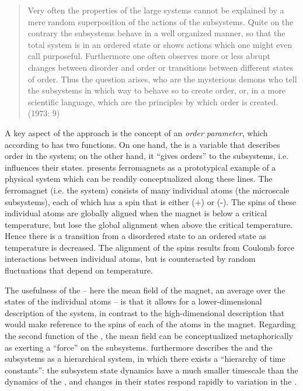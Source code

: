 \begin{quote}
    Very often the properties of the large systems cannot be explained by a mere random superposition of the actions of the subsystems. Quite on the contrary the subsystems behave in a well organized manner, so that the total system is in an ordered state or shows actions which one might even call purposeful. Furthermore one often observes more or less abrupt changes between disorder and order or transitions between different states of order. Thus the question arises, who are the mysterious demons who tell the subsystems in which way to behave so to create order, or, in a more scientific language, which are the principles by which order is created. (1973: 9)
\end{quote}

A key aspect of the  approach is the concept of an \textit{order parameter}, which according to  has two functions. On one hand, the  is a variable that describes order in the system; on the other hand, it “gives orders” \citep[10]{Haken1973} to the subsystems, i.e. influences their states.  presents ferromagnets as a prototypical example of a physical system which can be readily conceptualized along these lines. The ferromagnet (i.e. the  system) consists of many individual atoms (the microscale subsystems), each of which has a spin that is either (+) or (-). The spins of these individual atoms are globally aligned when the magnet is below a critical temperature, but lose the global alignment when above the critical temperature. Hence there is a transition from a disordered state to an ordered state as temperature is decreased. The alignment of the spins results from Coulomb force interactions between individual atoms, but is counteracted by random fluctuations that depend on temperature. 

The usefulness of the  -- here the mean field of the magnet, an average over the states of the individual atoms -- is that it allows for a lower-di\-men\-sional description of the system, in contrast to the high-di\-men\-sional description that would make reference to the spins of each of the atoms in the magnet. Regarding the second function of the , the mean field can be conceptualized metaphorically as exerting a “force” on the subsystems.  furthermore describes the  and the subsystems as a hierarchical system, in which there exists a “hierarchy of time constants”: the subsystem state dynamics have a much smaller timescale than the dynamics of the , and changes in their states respond rapidly to variation in the . 

